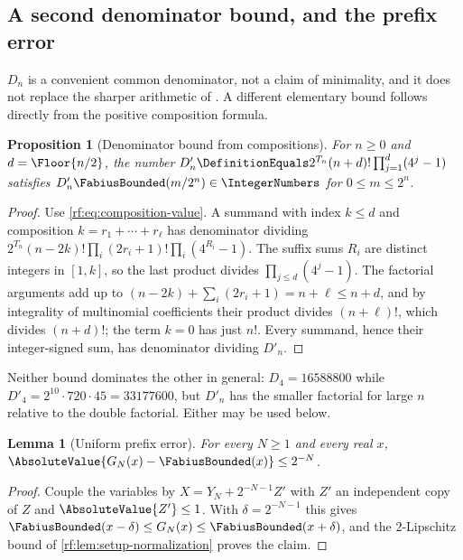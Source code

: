 \documentclass[11pt,oneside]{article}
\theoremstyle{plain}
\newtheorem{proposition}[theorem]{Proposition}
\newtheorem{lemma}[theorem]{Lemma}
\theoremstyle{definition}
\theoremstyle{remark}
\newcommand{\Fb}{\FabiusBounded}            %
\newcommand{\Tr}[1]{T_{#1}}                 %
\begin{document}
\subsection{A second denominator bound, and the prefix error}
\label{rf:sec:determinant-denominator}

$D_{n}$ is a convenient common denominator, not a claim of minimality, and
it does not replace the sharper arithmetic of \cite{arias2018}.  A different
elementary bound follows directly from the positive composition formula.

\begin{proposition}[Denominator bound from compositions]
\label{rf:prop:determinant-denominator}
For $n\ge0$ and $d=\Floor{n/2}$, the number
$D'_{n}\DefinitionEquals2^{\Tr{n}}(n+d)!\prod_{j=1}^{d}(4^{j}-1)$ satisfies
$D'_{n}\Fb(m/2^{n})\in\IntegerNumbers$ for $0\le m\le2^{n}$.
\end{proposition}

\begin{proof}
Use \cref{rf:eq:composition-value}.  A summand with index $k\le d$ and
composition $k=r_{1}+\cdots+r_{\ell}$ has denominator dividing
$2^{\Tr{n}}(n-2k)!\prod_{i}(2r_{i}+1)!\prod_{i}(4^{R_{i}}-1)$.  The suffix
sums $R_{i}$ are distinct integers in $[1,k]$, so the last product divides
$\prod_{j\le d}(4^{j}-1)$.  The factorial arguments add up to
$(n-2k)+\sum_{i}(2r_{i}+1)=n+\ell\le n+d$, and by integrality of
multinomial coefficients their product divides $(n+\ell)!$, which divides
$(n+d)!$; the term $k=0$ has just $n!$.  Every summand, hence their
integer-signed sum, has denominator dividing $D'_{n}$.
\end{proof}

Neither bound dominates the other in general: $D_{4}=16588800$ while
$D'_{4}=2^{10}\cdot720\cdot45=33177600$, but $D'_{n}$ has the smaller
factorial for large $n$ relative to the double factorial.  Either may be
used below.

\begin{lemma}[Uniform prefix error]
\label{rf:lem:determinant-prefix-error}
For every $N\ge1$ and every real $x$,
$\AbsoluteValue{G_{N}(x)-\Fb(x)}\le2^{-N}$.
\end{lemma}

\begin{proof}
Couple the variables by $X=Y_{N}+2^{-N-1}Z'$ with $Z'$ an independent copy
of $Z$ and $\AbsoluteValue{Z'}\le1$.  With $\delta=2^{-N-1}$ this gives
$\Fb(x-\delta)\le G_{N}(x)\le\Fb(x+\delta)$, and the $2$-Lipschitz bound of
\cref{rf:lem:setup-normalization} proves the claim.
\end{proof}
\end{document}
